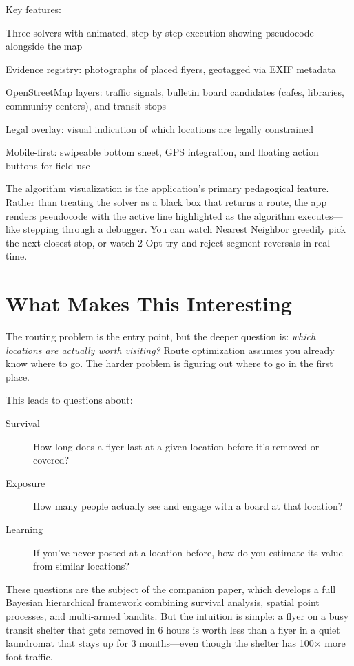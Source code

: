 \documentclass[sigconf,nonacm]{acmart}
\begin{document}
Key features:
\begin{enumerate*}[label=(\arabic*)]
    \item Three solvers with animated, step-by-step execution showing pseudocode alongside the map
    \item Evidence registry: photographs of placed flyers, geotagged via EXIF metadata
    \item OpenStreetMap layers: traffic signals, bulletin board candidates (cafes, libraries, community centers), and transit stops
    \item Legal overlay: visual indication of which locations are legally constrained
    \item Mobile-first: swipeable bottom sheet, GPS integration, and floating action buttons for field use
\end{enumerate*}

The algorithm visualization is the application's primary pedagogical feature. Rather than treating the solver as a black box that returns a route, the app renders pseudocode with the active line highlighted as the algorithm executes---like stepping through a debugger. You can watch Nearest Neighbor greedily pick the next closest stop, or watch 2-Opt try and reject segment reversals in real time.

\section{What Makes This Interesting}

The routing problem is the entry point, but the deeper question is: \emph{which locations are actually worth visiting?} Route optimization assumes you already know where to go. The harder problem is figuring out where to go in the first place.

This leads to questions about:
\begin{description}
    \item[Survival] How long does a flyer last at a given location before it's removed or covered?
    \item[Exposure] How many people actually see and engage with a board at that location?
    \item[Learning] If you've never posted at a location before, how do you estimate its value from similar locations?
\end{description}

These questions are the subject of the companion paper, which develops a full Bayesian hierarchical framework combining survival analysis, spatial point processes, and multi-armed bandits. But the intuition is simple: a flyer on a busy transit shelter that gets removed in 6 hours is worth less than a flyer in a quiet laundromat that stays up for 3 months---even though the shelter has 100$\times$ more foot traffic.
\end{document}
